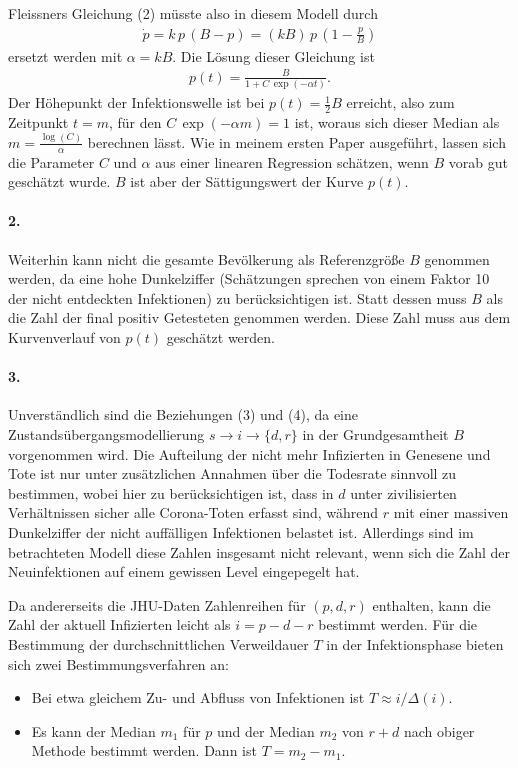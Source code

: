 \documentclass[a4paper,11pt]{article}
\begin{document}
Fleissners Gleichung (2) müsste also in diesem Modell durch
\begin{gather*}
  \dot{p}=k\,p\,(B-p)=(kB)\,p\,\left(1-\frac{p}{B}\right)\tag{2a}
\end{gather*}
ersetzt werden mit $\alpha=kB$.  Die Lösung dieser Gleichung ist
\begin{gather*}
  p(t)=\frac{B}{1+C\,\exp(-\alpha t)}.
\end{gather*}
Der Höhepunkt der Infektionswelle ist bei $p(t)=\frac12 B$ erreicht, also zum
Zeitpunkt $t=m$, für den $C\,\exp(-\alpha m)=1$ ist, woraus sich dieser Median
als $m=\frac{\log(C)}{\alpha}$ berechnen lässt.  Wie in meinem ersten Paper
ausgeführt, lassen sich die Parameter $C$ und $\alpha$ aus einer linearen
Regression schätzen, wenn $B$ vorab gut geschätzt wurde.  $B$ ist aber der
Sättigungswert der Kurve $p(t)$.

\paragraph{2.}
Weiterhin kann nicht die gesamte Bevölkerung als Referenzgröße
$B$ genommen werden, da eine hohe Dunkelziffer (Schätzungen sprechen von einem
Faktor 10 der nicht entdeckten Infektionen) zu berücksichtigen ist.  Statt
dessen muss $B$ als die Zahl der final positiv Getesteten genommen werden.
Diese Zahl muss aus dem Kurvenverlauf von $p(t)$ geschätzt werden.

\paragraph{3.}
Unverständlich sind die Beziehungen (3) und (4), da eine
Zustandsübergangsmodellierung $s\to i\to \{d,r\}$ in der Grundgesamtheit $B$
vorgenommen wird.  Die Aufteilung der nicht mehr Infizierten in Genesene und
Tote ist nur unter zusätzlichen Annahmen über die Todesrate sinnvoll zu
bestimmen, wobei hier zu berücksichtigen ist, dass in $d$ unter zivilisierten
Verhältnissen sicher alle Corona-Toten erfasst sind, während $r$ mit einer
massiven Dunkelziffer der nicht auffälligen Infektionen belastet ist.
Allerdings sind im betrachteten Modell diese Zahlen insgesamt nicht relevant,
wenn sich die Zahl der Neuinfektionen auf einem gewissen Level eingepegelt
hat. 

Da andererseits die JHU-Daten Zahlenreihen für $(p,d,r)$ enthalten, kann die
Zahl der aktuell Infizierten leicht als $i=p-d-r$ bestimmt werden.  Für die
Bestimmung der durchschnittlichen Verweildauer $T$ in der Infektionsphase
bieten sich zwei Bestimmungsverfahren an:
\begin{itemize}
\item Bei etwa gleichem Zu- und Abfluss von Infektionen ist $T\approx
  i/\Delta(i)$.
\item Es kann der Median $m_1$ für $p$ und der Median $m_2$ von $r+d$ nach
  obiger Methode bestimmt werden. Dann ist $T=m_2-m_1$. 
\end{itemize}
\end{document}
